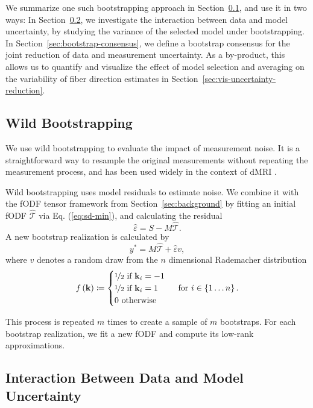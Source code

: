 We summarize one such bootstrapping approach in Section~\ref{sec:wild-bootstrap}, and use it in two ways: In Section~\ref{sec:data-vs-model-uncertainty}, we investigate the interaction between data and model uncertainty, by studying the variance of the selected model under bootstrapping. In Section~\ref{sec:bootstrap-consensus}, we define a bootstrap consensus for the joint reduction of data and measurement uncertainty. As a by-product, this allows us to quantify and visualize the effect of model selection and averaging on the variability of fiber direction estimates in Section~\ref{sec:vis-uncertainty-reduction}.

\subsection{Wild Bootstrapping}
\label{sec:wild-bootstrap}
We use wild bootstrapping to evaluate the impact of measurement noise. It is a straightforward way to
resample the original measurements without repeating the measurement process, and has been used widely in the context of dMRI
\cite{Jones:2008,Schultz:EuroVis2013,Siddiqui:2021}.

Wild bootstrapping uses model residuals to estimate noise. We combine it with the fODF tensor framework from Section~\ref{sec:background} by fitting an initial fODF
$\hat{\mathcal{T}}$ via Eq. (\ref{eq:sd-min}), and calculating the residual 
\[ \hat{\varepsilon} = S - M\hat{\mathcal{T}} .\] 
A new bootstrap realization is calculated by 
\[ y^{*} = M\hat{\mathcal{T}}  + \hat{\varepsilon} v , \]
where $v$ denotes a random draw from the $n$ dimensional Rademacher distribution
\[ f \left( \mathbf{k} \right) \coloneqq  \begin{cases} \nicefrac{1}{2} \text{ if }
		\mathbf{k}_i=-1 \\
		\nicefrac{1}{2} \text{ if } \mathbf{k}_i=1 \\
		0 \text { otherwise } 
\end{cases} \text{ for } i \in \left\{ 1\dots n \right\} . \]

This process is repeated $m$ times to create a sample of $m$ bootstraps. For each bootstrap realization, we fit a new fODF and compute its low-rank approximations.


\subsection{Interaction Between Data and Model Uncertainty}
\label{sec:data-vs-model-uncertainty}

